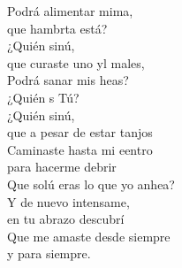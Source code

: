 \begin{cancion}
	Podrá alimentar mima, \\
	que hambrta está?\\
	¿Quién sinú, \\
	que curaste uno yl males,\\
	Podrá sanar mis heas?\\
	¿Quién s Tú?\\
	¿Quién sinú,\\
	que a pesar de estar tanjos\\
	Caminaste hasta mi eentro\\
	para hacerme debrir\\
	Que solú eras lo que yo anhea?\\
	Y de nuevo intensame,\\
	\jump
en tu abrazo descubrí\\
	\jump
Que me amaste desde siempre\\
	\jump
y para siempre.\\
\end{cancion}%
